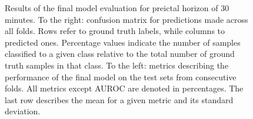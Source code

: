\documentclass[a4paper,fleqn]{cas-sc}
\begin{document}
\begin{figure}[hbt]
\begin{minipage}[t]{0.55\textwidth}
    \label{tab:metrics-lookback-1800}
  \end{minipage}
  
  \addtocounter{figure}{-1}
    \captionsetup{labelformat=andtable}
    \caption{Results of the final model evaluation for preictal horizon of 30 minutes. To the right: confusion matrix for predictions made across all folds. Rows refer to ground truth labels, while columns to predicted ones. Percentage values indicate the number of samples classified to a given class relative to the total number of ground truth samples in that class. To the left: metrics describing the performance of the final model on the test sets from consecutive folds. All metrics except AUROC are denoted in percentages. The last row describes the mean for a given metric and its standard deviation.}
\end{figure}
\end{document}
